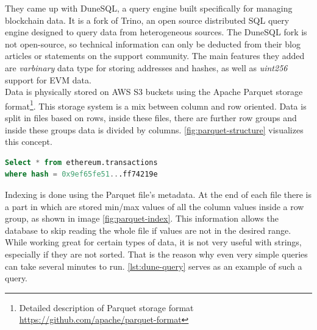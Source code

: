 They came up with DuneSQL, a query engine built specifically for managing blockchain data. It is a fork of Trino, an open source distributed SQL query engine designed to query data from heterogeneous sources. The DuneSQL fork is not open-source, so technical information can only be deducted from their blog articles or statements on the support community. The main features they added are \textit{varbinary} data type for storing addresses and hashes, as well as \textit{uint256} support for EVM data. \\

Data is physically stored on AWS S3 buckets using the Apache Parquet storage format\footnote{Detailed description of Parquet storage format \url{https://github.com/apache/parquet-format}}. This storage system is a mix between column and row oriented. Data is split in files based on rows, inside these files, there are further row groups and inside these groups data is divided by columns. \cref{fig:parquet-structure} visualizes this concept. 

\begin{lstlisting}[language=SQL,caption={Shortened simple query on DuneSQL that took 3 minutes to run},label={lst:dune-query},captionpos=b]
Select * from ethereum.transactions
where hash = 0x9ef65fe51...ff74219e
\end{lstlisting}

Indexing is done using the Parquet file's metadata. At the end of each file there is a part in which are stored min/max values of all the column values inside a row group, as shown in image \ref{fig:parquet-index}. This information allows the database to skip reading the whole file if values are not in the desired range. While working great for certain types of data, it is not very useful with strings, especially if they are not sorted. That is the reason why even very simple queries can take several minutes to run. \cref{lst:dune-query} serves as an example of such a query. 

